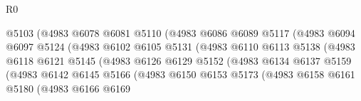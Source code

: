 \begin{lexlean}{R0}
\begin{coremodule}
                                    @5103
                                    (@4983
                                      @6078
                                      @6081
                                      @5110
                                      (@4983
                                        @6086
                                        @6089
                                        @5117
                                        (@4983
                                          @6094
                                          @6097
                                          @5124
                                          (@4983
                                            @6102
                                            @6105
                                            @5131
                                            (@4983
                                              @6110
                                              @6113
                                              @5138
                                              (@4983
                                                @6118
                                                @6121
                                                @5145
                                                (@4983
                                                  @6126
                                                  @6129
                                                  @5152
                                                  (@4983
                                                    @6134
                                                    @6137
                                                    @5159
                                                    (@4983
                                                      @6142
                                                      @6145
                                                      @5166
                                                      (@4983
                                                        @6150
                                                        @6153
                                                        @5173
                                                        (@4983
                                                          @6158
                                                          @6161
                                                          @5180
                                                          (@4983
                                                            @6166
                                                            @6169

\end{coremodule}
\end{lexlean}

